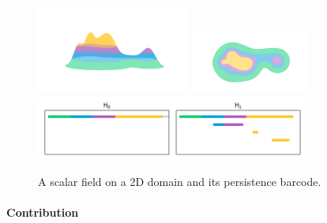 
\begin{figure}[htbp]
  \centering
  \includegraphics[trim=200 200 200 200, clip, width=0.45\textwidth]{scripts/figures/surf/side.png}
  \includegraphics[trim=250 0 50 100, clip, width=0.35\textwidth]{scripts/figures/surf/top.png}
  \includegraphics[width=0.8\textwidth]{scripts/figures/scalar_barcode_true.png}
  \caption{A scalar field on a 2D domain and its persistence barcode.}
\end{figure}

\paragraph*{Contribution}

